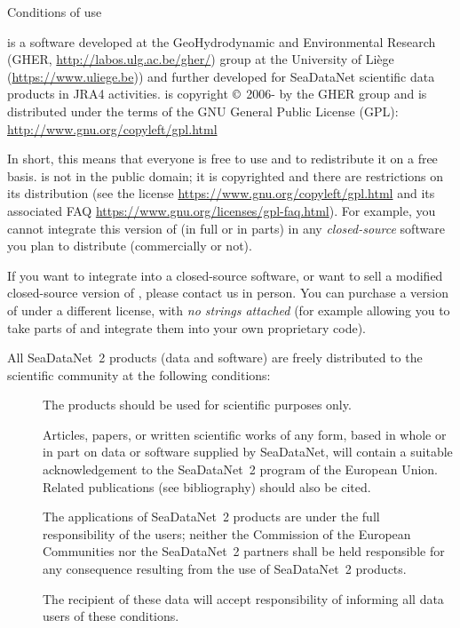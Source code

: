 
\vspace*{\fill}

\begin{center}
\begin{minipage}[c]{.85\textwidth}

\Large{Conditions of use}
\vspace{1cm}
\normalsize

 
\vspace{.25cm}
\diva is a software developed at the GeoHydrodynamic and Environmental Research (GHER, \url{http://labos.ulg.ac.be/gher/}) group at the University of Liège (\url{https://www.uliege.be})) and further developed for SeaDataNet scientific data products in \textsf{JRA4} activities. \diva is copyright $\copyright$  2006-\the\year\xspace by the GHER group and is distributed under the terms of the GNU General Public License (GPL): \url{http://www.gnu.org/copyleft/gpl.html} 

In short, this means that everyone is free to use \diva and to redistribute it on a free basis. \diva is not in the public domain; it is copyrighted and there are restrictions on its distribution (see the license \url{https://www.gnu.org/copyleft/gpl.html} and its associated FAQ \url{https://www.gnu.org/licenses/gpl-faq.html}). For example, you cannot integrate this version of \diva (in full or in parts) in any \textit{closed-source} software you plan to distribute (commercially or not).

If you want to integrate \diva into a closed-source software, or want to sell a modified closed-source version of \diva, please contact us in person. You can purchase a version of \diva under a different license, with \textit{no strings attached} (for example allowing you to take parts of \diva and integrate them into your own proprietary code).

\vspace{.25cm}
All SeaDataNet~2 products (data and software) are freely distributed to the scientific community at the following conditions: 

\begin{description}
\item[\checkmark] The products should be used for scientific purposes only.
\item[\checkmark] Articles, papers, or written scientific works of any form, based in whole or in part on data or software supplied by SeaDataNet, will contain a suitable acknowledgement to the SeaDataNet~2 program of the European Union. Related publications (see bibliography) should also be cited.
\item[\checkmark] The applications of SeaDataNet~2 products are under the full responsibility of the users; neither the Commission of the European Communities nor the SeaDataNet~2 partners shall be held responsible for any consequence resulting from the use of SeaDataNet~2 products. 
\item[\checkmark] The recipient of these data will accept responsibility of informing all data users of these conditions.
\end{description}


\end{minipage}
\end{center}
